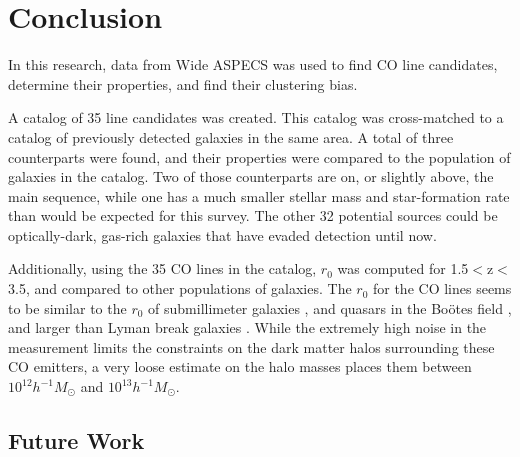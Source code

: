 \documentclass[twoside,single]{lion-msc}
\begin{document}
\chapter{Conclusion}

In this research, data from Wide ASPECS was used to find CO line candidates, determine their properties, and find their clustering bias.

A catalog of 35 line candidates was created. This catalog was cross-matched to a catalog of previously detected galaxies in the same area. A total of three counterparts were found, and their properties were compared to the population of galaxies in the catalog. Two of those counterparts are on, or slightly above, the main sequence, while one has a much smaller stellar mass and star-formation rate than would be expected for this survey. The other 32 potential sources could be optically-dark, gas-rich galaxies that have evaded detection until now. 

Additionally, using the 35 CO lines in the catalog, $r_0$ was computed for 1.5$<$z$<$3.5, and compared to other populations of galaxies. The $r_0$ for the CO lines seems to be similar to the $r_0$ of submillimeter galaxies \cite{10.1111/j.1365-2966.2011.20303.x}, and quasars in the Bo\"otes field \cite{hickox2011clustering}, and larger than Lyman break galaxies \cite{adelberger2005spatial}. While the extremely high noise in the measurement limits the constraints on the dark matter halos surrounding these CO emitters, a very loose estimate on the halo masses places them between $10^{12} h^{-1}M_{\odot}$ and $10^{13} h^{-1}M_{\odot}$.


\section{Future Work}\label{sec:Future_Work}
\end{document}
